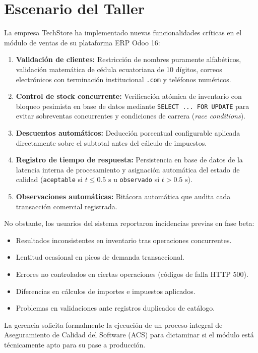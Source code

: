 \documentclass{article}
\begin{document}
\section{Escenario del Taller}
La empresa TechStore ha implementado nuevas funcionalidades críticas en el módulo de ventas de su plataforma ERP Odoo 16:
\begin{enumerate}[leftmargin=*]
\item \textbf{Validación de clientes:} Restricción de nombres puramente alfabéticos, validación matemática de cédula ecuatoriana de 10 dígitos, correos electrónicos con terminación institucional \texttt{.com} y teléfonos numéricos.
\item \textbf{Control de stock concurrente:} Verificación atómica de inventario con bloqueo pesimista en base de datos mediante \texttt{SELECT ... FOR UPDATE} para evitar sobreventas concurrentes y condiciones de carrera (\textit{race conditions}).
\item \textbf{Descuentos automáticos:} Deducción porcentual configurable aplicada directamente sobre el subtotal antes del cálculo de impuestos.
\item \textbf{Registro de tiempo de respuesta:} Persistencia en base de datos de la latencia interna de procesamiento y asignación automática del estado de calidad (\texttt{aceptable} si $t \le 0.5\text{ s}$ u \texttt{observado} si $t > 0.5\text{ s}$).
\item \textbf{Observaciones automáticas:} Bitácora automática que audita cada transacción comercial registrada.
\end{enumerate}

No obstante, los usuarios del sistema reportaron incidencias previas en fase beta:
\begin{itemize}[leftmargin=*]
\item Resultados inconsistentes en inventario tras operaciones concurrentes.
\item Lentitud ocasional en picos de demanda transaccional.
\item Errores no controlados en ciertas operaciones (códigos de falla HTTP 500).
\item Diferencias en cálculos de importes e impuestos aplicados.
\item Problemas en validaciones ante registros duplicados de catálogo.
\end{itemize}

La gerencia solicita formalmente la ejecución de un proceso integral de Aseguramiento de Calidad del Software (ACS) para dictaminar si el módulo está técnicamente apto para su pase a producción.
\end{document}
